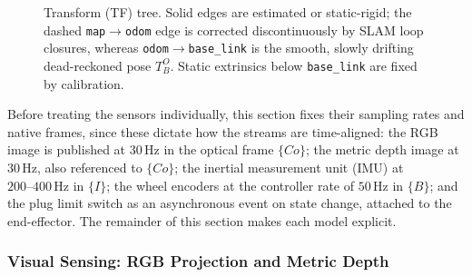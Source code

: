 \begin{figure}[!htb]
\centering
{}
\caption{Transform (TF) tree. Solid edges are estimated or static-rigid; the dashed \texttt{map}$\rightarrow$\texttt{odom} edge is corrected discontinuously by SLAM loop closures, whereas \texttt{odom}$\rightarrow$\texttt{base\_link} is the smooth, slowly drifting dead-reckoned pose $T^{O}_{B}$. Static extrinsics below \texttt{base\_link} are fixed by calibration.}
\label{meth:fig:tftree}
\end{figure}

Before treating the sensors individually, this section fixes their sampling rates and native frames, since these dictate how the streams are time-aligned: the RGB image is published at \ensuremath{30\,\mathrm{Hz}} in the optical frame $\{Co\}$; the metric depth image at \ensuremath{30\,\mathrm{Hz}}, also referenced to $\{Co\}$; the inertial measurement unit (IMU) at \ensuremath{200\text{--}400\,\mathrm{Hz}} in $\{I\}$; the wheel encoders at the controller rate of \ensuremath{50\,\mathrm{Hz}} in $\{B\}$; and the plug limit switch as an asynchronous event on state change, attached to the end-effector. The remainder of this section makes each model explicit.

\subsubsection{Visual Sensing: RGB Projection and Metric Depth}


